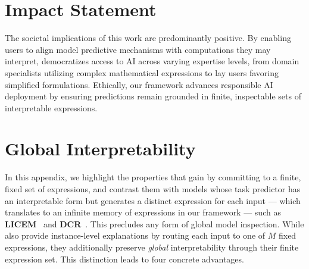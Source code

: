 \documentclass{article}
\theoremstyle{plain}
\theoremstyle{definition}
\theoremstyle{remark}
\begin{document}
\section*{Impact Statement}

The societal implications of this work are predominantly positive. By enabling users to align model predictive mechanisms with computations they may interpret, \classacro{} democratizes access to AI across varying expertise levels, from domain specialists utilizing complex mathematical expressions to lay users favoring simplified formulations. Ethically, our framework advances responsible AI deployment by ensuring predictions remain grounded in finite, inspectable sets of interpretable expressions.









\newpage
\appendix
\onecolumn

\section{Global Interpretability}
\label{app:global_interpretability}

In this appendix, we highlight the properties that \classacro{} gain by committing to a finite, fixed set of expressions, and contrast them with models whose task predictor has an interpretable form but generates a distinct expression for each input — which translates to an infinite memory of expressions in our framework — such as \textbf{LICEM}~\citep{de2025} and \textbf{DCR}~\citep{barbiero2023}. This precludes any form of global model inspection. While \classacro{} also provide instance-level explanations by routing each input to one of $M$ fixed expressions, they additionally preserve \emph{global} interpretability through their finite expression set. This distinction leads to four concrete advantages.
\end{document}
